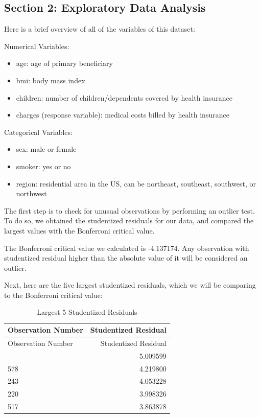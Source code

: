 \documentclass[
  12pt,
]{article}
\providecommand{\tightlist}{%
  \setlength{\itemsep}{0pt}\setlength{\parskip}{0pt}}
\begin{document}
\newpage

\subsection{Section 2: Exploratory Data
Analysis}\label{section-2-exploratory-data-analysis}

Here is a brief overview of all of the variables of this dataset:

Numerical Variables:

\begin{itemize}
\tightlist
\item
  age: age of primary beneficiary
\item
  bmi: body mass index
\item
  children: number of children/dependents covered by health insurance
\item
  charges (response variable): medical costs billed by health insurance
\end{itemize}

Categorical Variables:

\begin{itemize}
\tightlist
\item
  sex: male or female
\item
  smoker: yes or no
\item
  region: residential area in the US, can be northeast, southeast,
  southwest, or northwest
\end{itemize}

The first step is to check for unusual observations by performing an
outlier test. To do so, we obtained the studentized residuals for our
data, and compared the largest values with the Bonferroni critical
value.

The Bonferroni critical value we calculated is -4.137174. Any
observation with studentized residual higher than the absolute value of
it will be considered an outlier.

Next, here are the five largest studentized residuals, which we will be
comparing to the Bonferroni critical value:

\begin{longtable}[]{@{}lr@{}}
\caption{Largest 5 Studentized Residuals}\tabularnewline
\toprule\noalign{}
Observation Number & Studentized Residual \\
\midrule\noalign{}
\endfirsthead
\toprule\noalign{}
Observation Number & Studentized Residual \\
\midrule\noalign{}
\endhead
\bottomrule\noalign{}
\endlastfoot
1301 & 5.009599 \\
578 & 4.219800 \\
243 & 4.053228 \\
220 & 3.998326 \\
517 & 3.863878 \\
\end{longtable}
\end{document}
